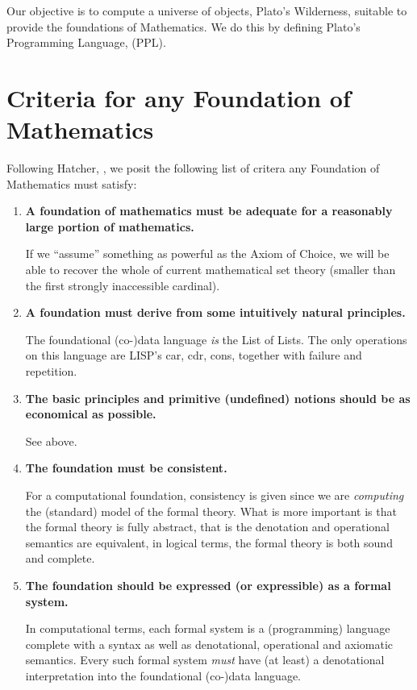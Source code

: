 Our objective is to compute a universe of objects, Plato's Wilderness, suitable
to provide the foundations of Mathematics. We do this by defining Plato's
Programming Language, (PPL).

\section{Criteria for any Foundation of Mathematics}

Following Hatcher, \cite{hatcher1982logicalFoundationsMath}, we posit the
following list of critera any Foundation of Mathematics must satisfy:

\begin{enumerate}
\item \textbf{A foundation of mathematics must be adequate for a reasonably large
portion of mathematics.}

\noindent If we ``assume'' something as powerful as the Axiom of Choice, we will
be able to recover the whole of current mathematical set theory (smaller than
the first strongly inaccessible cardinal).

\item \textbf{A foundation must derive from some intuitively natural principles.}

\noindent The foundational (co-)data language \emph{is} the List of Lists. The
only operations on this language are LISP's car, cdr, cons, together with
failure and repetition.

\item \textbf{The basic principles and primitive (undefined) notions should be
as economical as possible.}

\noindent See above.

\item \textbf{The foundation must be consistent.}

\noindent For a computational foundation, consistency is given since we are
\emph{computing} the (standard) model of the formal theory. What is more
important is that the formal theory is fully abstract, that is the denotation
and operational semantics are equivalent, in logical terms, the formal theory is
both sound and complete.

\item \textbf{The foundation should be expressed (or expressible) as a formal system.}

\noindent In computational terms, each formal system is a (programming) language
complete with a syntax as well as denotational, operational and axiomatic
semantics. Every such formal system \emph{must} have (at least) a denotational
interpretation into the foundational (co-)data language.


\end{enumerate}
